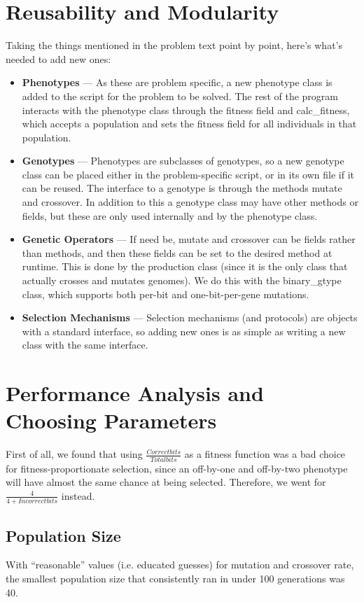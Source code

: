 \documentclass[a4paper,12pt]{article}
\begin{document}
\section{Reusability and Modularity}
Taking the things mentioned in the problem text point by point, here's what's needed to add new ones:
\begin{itemize}
\item{\textbf{Phenotypes} --- As these are problem specific, a new phenotype class is added to the script for the problem to be solved. The rest of the program interacts with the phenotype class through the fitness field and calc\_fitness, which accepts a population and sets the fitness field for all individuals in that population.}
\item{\textbf{Genotypes} --- Phenotypes are subclasses of genotypes, so a new genotype class can be placed either in the problem-specific script, or in its own file if it can be reused. The interface to a genotype is through the methods mutate and crossover. In addition to this a genotype class may have other methods or fields, but these are only used internally and by the phenotype class.}
\item{\textbf{Genetic Operators} --- If need be, mutate and crossover can be fields rather than methods, and then these fields can be set to the desired method at runtime. This is done by the production class (since it is the only class that actually crosses and mutates genomes). We do this with the binary\_gtype class, which supports both per-bit and one-bit-per-gene mutations.}
\item{\textbf{Selection Mechanisms} --- Selection mechanisms (and protocols) are objects with a standard interface, so adding new ones is as simple as writing a new class with the same interface.}
\end{itemize}

\section{Performance Analysis and Choosing Parameters}
First of all, we found that using $\frac{Correct bits}{Total bits}$ as a fitness function was a bad choice for fitness-proportionate selection, since an off-by-one and off-by-two phenotype will have almost the same chance at being selected. Therefore, we went for $\frac{4}{4+Incorrect bits}$ instead. 

\subsection{Population Size}
With ``reasonable'' values (i.e. educated guesses) for mutation and crossover rate, the smallest population size that consistently ran in under 100 generations was 40. 
\end{document}
